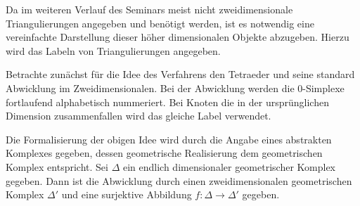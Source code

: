 \begin{Bem}
  Da im weiteren Verlauf des Seminars meist nicht zweidimensionale
  Triangulierungen angegeben und benötigt werden, ist es notwendig
  eine vereinfachte Darstellung dieser höher dimensionalen Objekte
  abzugeben. Hierzu wird das Labeln von Triangulierungen angegeben.

  Betrachte zunächst für die Idee des Verfahrens den Tetraeder und
  seine standard Abwicklung im Zweidimensionalen.
  Bei der Abwicklung werden die $0$-Simplexe fortlaufend alphabetisch
  nummeriert. Bei Knoten die in der ursprünglichen Dimension
  zusammenfallen wird das gleiche Label verwendet.

  Die Formalisierung der obigen Idee wird durch die Angabe eines
  abstrakten Komplexes gegeben, dessen geometrische Realisierung dem
  geometrischen Komplex entspricht. Sei $\Delta$ ein endlich
  dimensionaler geometrischer Komplex gegeben. Dann ist die Abwicklung
  durch einen zweidimensionalen geometrischen Komplex $\Delta'$ und
  eine surjektive Abbildung $f: \Delta \rightarrow \Delta'$ gegeben.


\end{Bem}




